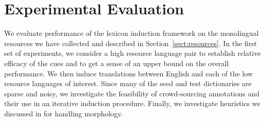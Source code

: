 \documentclass{article}
\newcommand{\secref}[1]{Section~\ref{#1}}
\begin{document}

\section{Experimental Evaluation}

We evaluate performance of the lexicon induction framework on the monolingual resources we have collected and described in \secref{sect:resources}.  In the first set of experiments, we consider a high resource language pair to establish relative efficacy of the cues and to get a sense of an upper bound on the overall performance. We then induce translations between English and each of the low resource languages of interest.  Since many of the seed and test dictionaries are sparse and noisy, we investigate the feasibility of crowd-sourcing annotations and their use in an iterative induction procedure.  Finally, we investigate heuristics we discussed in \label{sect:morph} for handling morphology.\\
\end{document}
